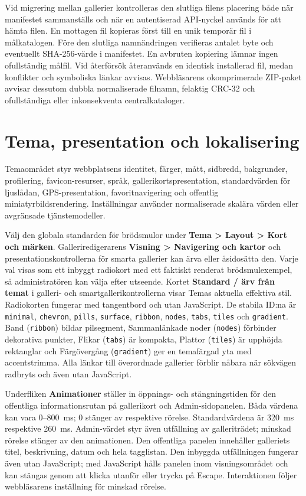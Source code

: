 \documentclass[11pt,a4paper]{article}
\newcommand{\ui}[1]{\textbf{#1}}
\newcommand{\codeword}[1]{\nolinkurl{#1}}
\begin{document}
Vid migrering mellan gallerier kontrolleras den slutliga filens placering både
när manifestet sammanställs och när en autentiserad API-nyckel används för att
hämta filen. En mottagen fil kopieras först till en unik temporär fil i
målkatalogen. Före den slutliga namnändringen verifieras antalet byte och
eventuellt SHA-256-värde i manifestet. En avbruten kopiering lämnar ingen
ofullständig målfil. Vid återförsök återanvänds en identisk installerad fil,
medan konflikter och symboliska länkar avvisas. Webbläsarens okomprimerade
ZIP-paket avvisar dessutom dubbla normaliserade filnamn, felaktig CRC-32 och
ofullständiga eller inkonsekventa centralkataloger.

\section{Tema, presentation och lokalisering}
\label{sec:theme}

Temaområdet styr webbplatsens identitet, färger, mått, sidbredd, bakgrunder,
profilering, favicon-resurser, språk, gallerikortspresentation, standardvärden
för ljuslådan, GPS-presentation, favoritnavigering och offentlig
miniatyrbildsrendering. Inställningar använder normaliserade skalära värden
eller avgränsade tjänstemodeller.

Välj den globala standarden för brödsmulor under \ui{Tema > Layout > Kort och
märken}. Galleriredigerarens \ui{Visning > Navigering och kartor} och
presentationskontrollerna för smarta gallerier kan ärva eller åsidosätta den.
Varje val visas som ett inbyggt radiokort med ett faktiskt renderat
brödsmulexempel, så administratören kan välja efter utseende. Kortet
\ui{Standard / ärv från temat} i galleri- och smartgallerikontrollerna visar
Temas aktuella effektiva stil. Radiokorten fungerar med tangentbord och utan
JavaScript. De stabila ID:na är \codeword{minimal}, \codeword{chevron},
\codeword{pills}, \codeword{surface}, \codeword{ribbon}, \codeword{nodes},
\codeword{tabs}, \codeword{tiles} och \codeword{gradient}. Band
(\codeword{ribbon}) bildar pilsegment, Sammanlänkade noder (\codeword{nodes})
förbinder dekorativa punkter, Flikar (\codeword{tabs}) är kompakta, Plattor
(\codeword{tiles}) är upphöjda rektanglar och Färgövergång (\codeword{gradient})
ger en temafärgad yta med accentstrimma. Alla länkar till överordnade gallerier
förblir nåbara när sökvägen radbryts och även utan JavaScript.

Underfliken \ui{Animationer} ställer in öppnings- och stängningstiden för den
offentliga informationsrutan på gallerikort och Admin-sidopanelen. Båda värdena
kan vara 0--800~ms; 0 stänger av respektive rörelse. Standardvärdena är 320~ms
respektive 260~ms. Admin-värdet styr även utfällning av galleriträdet;
minskad rörelse stänger av den animationen. Den offentliga panelen innehåller galleriets titel,
beskrivning, datum och hela tagglistan. Den inbyggda utfällningen fungerar även
utan JavaScript; med JavaScript hålls panelen inom visningsområdet och kan
stängas genom att klicka utanför eller trycka på Escape. Interaktionen följer
webbläsarens inställning för minskad rörelse.
\end{document}
